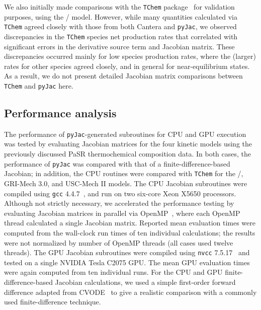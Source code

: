 \documentclass[preprint,12pt]{elsarticle}
\begin{document}
{We also initially made comparisons with the \texttt{TChem} package~\cite{Safta:2011vn} for validation purposes, using the \slash {} model.
However, while many quantities calculated via \texttt{TChem} agreed closely with those from both Cantera and \texttt{pyJac}, we observed discrepancies in the \texttt{TChem} species net production rates that correlated with significant errors in the derivative source term and Jacobian matrix.
These discrepancies occurred mainly for low species production rates, where the (larger) rates for other species agreed closely, and in general for near-equilibrium states.
As a result, we do not present detailed Jacobian matrix comparisons between \texttt{TChem} and \texttt{pyJac} here.

\subsection{Performance analysis}
\label{s:performance}

The performance of \texttt{pyJac}-generated subroutines for CPU and GPU execution was tested by evaluating Jacobian matrices for the four kinetic models using the previously discussed PaSR thermochemical composition data.
In both cases, the performance of \texttt{pyJac} was compared with that of a finite-difference-based Jacobian; in addition, the CPU routines were compared with \texttt{TChem} for the \slash {}, GRI-Mech 3.0, and USC-Mech II models.
The CPU Jacobian subroutines were compiled using \texttt{gcc} 4.4.7~\cite{gcc-4.4.7}, and run on two six-core Xeon X5650 processors.
Although not strictly necessary, we accelerated the performance testing by evaluating Jacobian matrices in parallel via OpenMP~\cite{Dagum:1998}, where each OpenMP thread calculated a single Jacobian matrix.
Reported mean evaluation times were computed from the wall-clock run times of ten individual calculations; the results were not normalized by number of OpenMP threads (all cases used twelve threads).
The GPU Jacobian subroutines were compiled using \texttt{nvcc} 7.5.17~\cite{cuda-7.5} and tested on a single NVIDIA Tesla C2075 GPU.
The mean GPU evaluation times were again computed from ten individual runs.
For the CPU and GPU finite-difference-based Jacobian calculations, we used a simple first-order forward difference adapted from CVODE~\cite{Hindmarsh:2005hg} to give a realistic comparison with a commonly used finite-difference technique.

}
\end{document}
